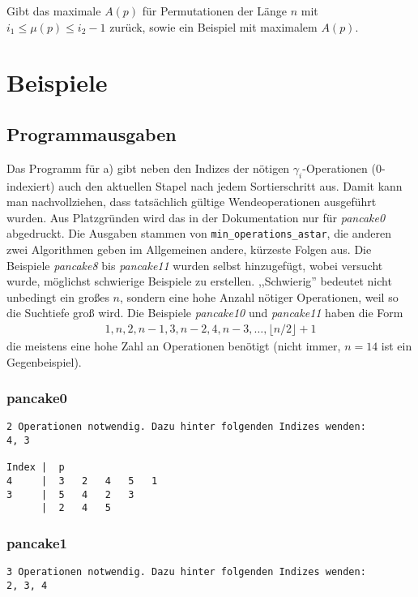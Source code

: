 \documentclass[a4paper, 10pt, ngerman]{article}
\begin{document}
\noindent Gibt das maximale $A(p)$ für Permutationen der Länge $n$ mit $i_1 \le \mu(p) \le i_2 - 1$ zurück, sowie ein Beispiel mit maximalem $A(p)$.

\section{Beispiele}

\subsection{Programmausgaben}

Das Programm für a) gibt neben den Indizes der nötigen $\gamma_i$-Operationen (0-indexiert) auch den aktuellen Stapel nach jedem Sortierschritt aus. Damit kann man nachvollziehen, dass tatsächlich gültige Wendeoperationen ausgeführt wurden. Aus Platzgründen wird das in der Dokumentation nur für \emph{pancake0} abgedruckt. Die Ausgaben stammen von \verb|min_operations_astar|, die anderen zwei Algorithmen geben im Allgemeinen andere, kürzeste Folgen aus. Die Beispiele \emph{pancake8} bis \emph{pancake11} wurden selbst hinzugefügt, wobei versucht wurde, möglichst schwierige Beispiele zu erstellen. ,,Schwierig'' bedeutet nicht unbedingt ein großes $n$, sondern eine hohe Anzahl nötiger Operationen, weil so die Suchtiefe groß wird. Die Beispiele \emph{pancake10} und \emph{pancake11} haben die Form
\begin{align*}
    1, n, 2, n - 1, 3, n - 2, 4, n - 3, \dots, \lfloor n/2 \rfloor + 1
\end{align*}
die meistens eine hohe Zahl an Operationen benötigt (nicht immer, $n = 14$ ist ein Gegenbeispiel).

\subsubsection*{pancake0}
\begin{lstlisting}[numbers=none]
2 Operationen notwendig. Dazu hinter folgenden Indizes wenden:
4, 3

Index |  p
4     |  3   2   4   5   1   
3     |  5   4   2   3   
      |  2   4   5   
\end{lstlisting}

\subsubsection*{pancake1}
\begin{lstlisting}[numbers=none]
3 Operationen notwendig. Dazu hinter folgenden Indizes wenden:
2, 3, 4
\end{lstlisting}
\end{document}
